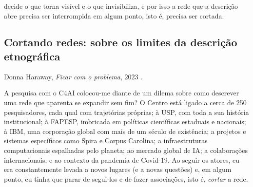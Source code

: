 \parencite{Latour2011CienciaEmAcao} decide o que torna visível e o que invisibiliza, e por isso a rede que a descrição abre precisa ser interrompida em algum ponto, isto é, precisa ser cortada. 

\subsection{Cortando redes: sobre os limites da descrição etnográfica}
\label{subsec:cortando-redes}

%
{Donna Haraway, \textit{Ficar com o problema}, 2023 \parencite[p.~60]{Haraway2023Ficar}.}

A pesquisa com o C4AI colocou-me diante de um dilema sobre como descrever uma rede que aparenta se expandir sem fim? O Centro está ligado a cerca de 250 pesquisadores, cada qual com trajetórias próprias; à USP, com toda a sua história institucional; à FAPESP, imbricada em políticas científicas estaduais e nacionais; à IBM, uma corporação global com mais de um século de existência; a projetos e sistemas específicos como Spira e Corpus Carolina; a infraestruturas computacionais espalhadas pelo planeta; ao mercado global de IA; a colaborações internacionais; e ao contexto da pandemia de Covid-19. Ao seguir os atores, eu era constantemente levada a novos lugares (e a novas questões) e, em algum ponto, eu tinha que parar de segui-los e de fazer associações, isto é, \textit{cortar} a rede.

